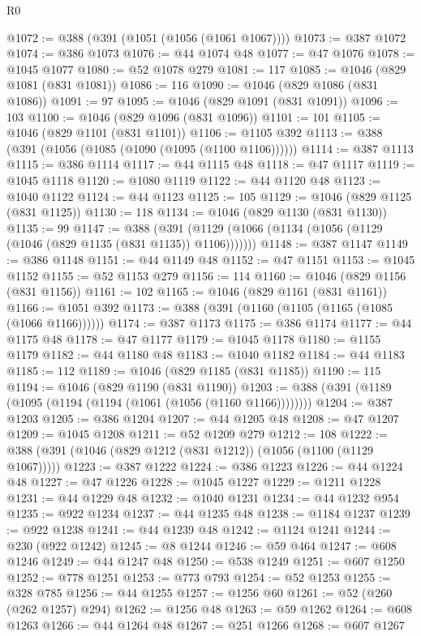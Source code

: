 \begin{lexlean}{R0}
\begin{coremodule}
@1072 := @388 (@391 (@1051 (@1056 (@1061 @1067))))
@1073 := @387 @1072
@1074 := @386 @1073
@1076 := @44 @1074 @48
@1077 := @47 @1076
@1078 := @1045 @1077
@1080 := @52 @1078 @279
@1081 := 117
@1085 := @1046 (@829 @1081 (@831 @1081))
@1086 := 116
@1090 := @1046 (@829 @1086 (@831 @1086))
@1091 := 97
@1095 := @1046 (@829 @1091 (@831 @1091))
@1096 := 103
@1100 := @1046 (@829 @1096 (@831 @1096))
@1101 := 101
@1105 := @1046 (@829 @1101 (@831 @1101))
@1106 := @1105 @392
@1113 := @388 (@391 (@1056 (@1085 (@1090 (@1095 (@1100 @1106))))))
@1114 := @387 @1113
@1115 := @386 @1114
@1117 := @44 @1115 @48
@1118 := @47 @1117
@1119 := @1045 @1118
@1120 := @1080 @1119
@1122 := @44 @1120 @48
@1123 := @1040 @1122
@1124 := @44 @1123
@1125 := 105
@1129 := @1046 (@829 @1125 (@831 @1125))
@1130 := 118
@1134 := @1046 (@829 @1130 (@831 @1130))
@1135 := 99
@1147 := @388 (@391 (@1129 (@1066 (@1134 (@1056 (@1129 (@1046 (@829 @1135 (@831 @1135)) @1106)))))))
@1148 := @387 @1147
@1149 := @386 @1148
@1151 := @44 @1149 @48
@1152 := @47 @1151
@1153 := @1045 @1152
@1155 := @52 @1153 @279
@1156 := 114
@1160 := @1046 (@829 @1156 (@831 @1156))
@1161 := 102
@1165 := @1046 (@829 @1161 (@831 @1161))
@1166 := @1051 @392
@1173 := @388 (@391 (@1160 (@1105 (@1165 (@1085 (@1066 @1166))))))
@1174 := @387 @1173
@1175 := @386 @1174
@1177 := @44 @1175 @48
@1178 := @47 @1177
@1179 := @1045 @1178
@1180 := @1155 @1179
@1182 := @44 @1180 @48
@1183 := @1040 @1182
@1184 := @44 @1183
@1185 := 112
@1189 := @1046 (@829 @1185 (@831 @1185))
@1190 := 115
@1194 := @1046 (@829 @1190 (@831 @1190))
@1203 := @388 (@391 (@1189 (@1095 (@1194 (@1194 (@1061 (@1056 (@1160 @1166))))))))
@1204 := @387 @1203
@1205 := @386 @1204
@1207 := @44 @1205 @48
@1208 := @47 @1207
@1209 := @1045 @1208
@1211 := @52 @1209 @279
@1212 := 108
@1222 := @388 (@391 (@1046 (@829 @1212 (@831 @1212)) (@1056 (@1100 (@1129 @1067)))))
@1223 := @387 @1222
@1224 := @386 @1223
@1226 := @44 @1224 @48
@1227 := @47 @1226
@1228 := @1045 @1227
@1229 := @1211 @1228
@1231 := @44 @1229 @48
@1232 := @1040 @1231
@1234 := @44 @1232 @954
@1235 := @922 @1234
@1237 := @44 @1235 @48
@1238 := @1184 @1237
@1239 := @922 @1238
@1241 := @44 @1239 @48
@1242 := @1124 @1241
@1244 := @230 (@922 @1242)
@1245 := @8 @1244
@1246 := @59 @464
@1247 := @608 @1246
@1249 := @44 @1247 @48
@1250 := @538 @1249
@1251 := @607 @1250
@1252 := @778 @1251
@1253 := @773 @793
@1254 := @52 @1253
@1255 := @328 @785
@1256 := @44 @1255
@1257 := @1256 @60
@1261 := @52 (@260 (@262 @1257) @294)
@1262 := @1256 @48
@1263 := @59 @1262
@1264 := @608 @1263
@1266 := @44 @1264 @48
@1267 := @251 @1266
@1268 := @607 @1267

\end{coremodule}
\end{lexlean}
